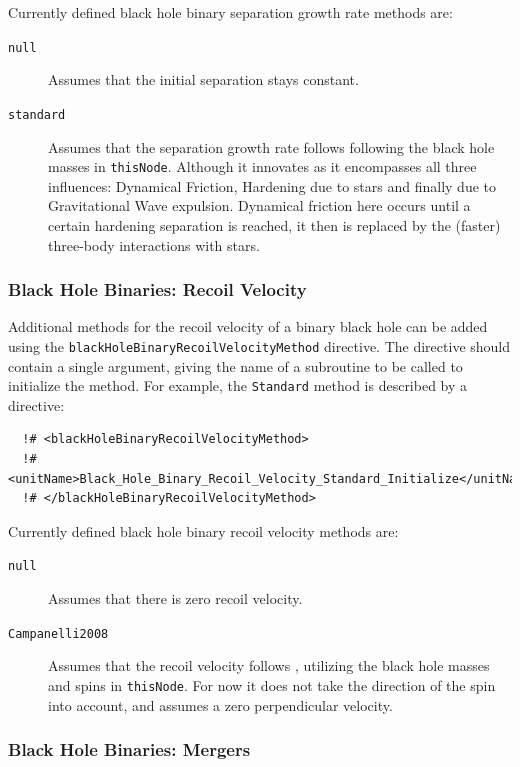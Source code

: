 Currently defined black hole binary separation growth rate methods are:
\begin{description}
 \item [{\tt null}] Assumes that the initial separation stays constant.
 \item [{\tt standard}] Assumes that the separation growth rate follows \cite{volonteri_assembly_2003} following the black hole masses in {\tt thisNode}. Although it innovates as it encompasses all three influences: Dynamical Friction, Hardening due to stars and finally due to Gravitational Wave expulsion. Dynamical friction here occurs until a certain hardening separation is reached, it then is replaced by the (faster) three-body interactions with stars.
\end{description}

\subsubsection{Black Hole Binaries: Recoil Velocity}

Additional methods for the recoil velocity of a binary black hole can be added using the {\tt blackHoleBinaryRecoilVelocityMethod} directive. The directive should contain a single argument, giving the name of a subroutine to be called to initialize the method. For example, the {\tt Standard} method is described by a directive:

\begin{verbatim}
  !# <blackHoleBinaryRecoilVelocityMethod>
  !#  <unitName>Black_Hole_Binary_Recoil_Velocity_Standard_Initialize</unitName>
  !# </blackHoleBinaryRecoilVelocityMethod>
\end{verbatim}

Currently defined black hole binary recoil velocity methods are:
\begin{description}
 \item [{\tt null}] Assumes that there is zero recoil velocity.
 \item [{\tt Campanelli2008}] Assumes that the recoil velocity follows \cite{campanelli_large_2007}, utilizing the black hole masses and spins in {\tt thisNode}. For now it does not take the direction of the spin into account, and assumes a zero perpendicular velocity.
\end{description}

\subsubsection{Black Hole Binaries: Mergers}\label{sec:BlackHoleBinaryMergers}

